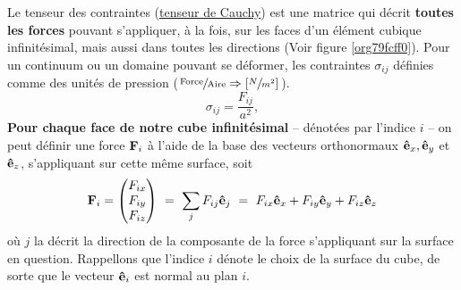 \documentclass[10pt]{article}
\numberwithin{equation}{section}
\newcommand{\evf}{\vb{\hat{e}}}
\newcommand{\pt}{\hspace{1pt}} %
\begin{document}
Le tenseur des contraintes (\href{https://en.wikipedia.org/wiki/Cauchy\_stress\_tensor}{tenseur de Cauchy}) est une matrice qui décrit \textbf{toutes les forces} pouvant s'appliquer, à la fois, sur les faces d'un élément cubique infinitésimal, mais aussi dans toutes les directions (Voir figure \ref{org79fcff0}).
Pour un continuum ou un domaine pouvant se déformer, les contraintes \(\sigma_{ij}\) définies comme des unités de pression    (\(\pt\sfrac{\text{Force}}{\text{Aire}}\Rightarrow\qty[\sfrac{N}{m^2}]\pt\)).\bigskip
\begin{equation}
    \sigma_{ij} = \frac{F_{ij}}{a^2},
\end{equation}
\textbf{Pour chaque face de notre cube infinitésimal} -- dénotées par l'indice \(i\) -- on peut définir une force \(\vb{F}_i\) à l'aide de la base des vecteurs orthonormaux \(\evf_x,\evf_y\) et \(\evf_z\), s'appliquant sur cette même surface, soit
\begin{equation}
   \vb{F}_i =
   \begin{pmatrix}
     F_{ix} \\
     F_{iy} \\
     F_{iz} \\
   \end{pmatrix}\  = \ \sum_j F_{ij}\evf_j\ = \ F_{ix}\evf_x + F_{iy}\evf_y + F_{iz}\evf_z
\end{equation}
où \(j\) la décrit la direction de la composante de la force s'appliquant sur la surface en question.
Rappellons que l'indice \(i\) dénote le choix de la surface du cube, de sorte que le vecteur \(\evf_i\) est normal au plan \(i\).
\end{document}
